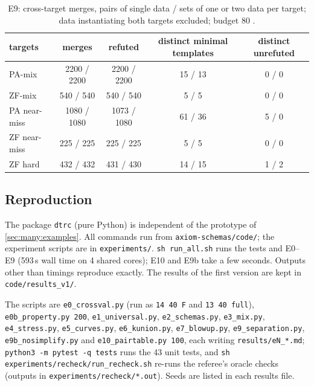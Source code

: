 \begin{table}[ht]
\centering\small
\begin{tabular}{@{}lcccc@{}}
\toprule
targets & merges & refuted & distinct minimal templates & distinct unrefuted\\
\midrule
PA-mix & 2200 / 2200 & 2200 / 2200 & 15 / 13 & 0 / 0\\
ZF-mix & 540 / 540 & 540 / 540 & 5 / 5 & 0 / 0\\
PA near-miss & 1080 / 1080 & 1073 / 1080 & 61 / 36 & 5 / 0\\
ZF near-miss & 225 / 225 & 225 / 225 & 5 / 5 & 0 / 0\\
ZF hard & 432 / 432 & 431 / 430 & 14 / 15 & 1 / 2\\
\bottomrule
\end{tabular}
\caption{E9: cross-target merges, pairs of single data / sets of one or two data per target; data instantiating both targets excluded; budget $80$ .}
\label{tab:exp:e9}
\end{table}

\subsection{Reproduction}\label{app:exp:repro}

The package \texttt{dtrc} (pure Python) is independent of the prototype of \cref{sec:many:examples}. All commands run from \texttt{axiom-schemas/code/}; the experiment scripts are in \texttt{experiments/}. \texttt{sh run\_all.sh} runs the tests and E0--E9 (593\,s wall time on 4 shared cores); E10 and E9b take a few seconds. Outputs other than timings reproduce exactly. The results of the first version are kept in \texttt{code/results\_v1/}.

\begin{sloppypar}
The scripts are \texttt{e0\_crossval.py} (run as \texttt{14 40 F} and \texttt{13 40 full}), \texttt{e0b\_property.py 200}, \texttt{e1\_universal.py}, \texttt{e2\_schemas.py}, \texttt{e3\_mix.py}, \texttt{e4\_stress.py}, \texttt{e5\_curves.py}, \texttt{e6\_kunion.py}, \texttt{e7\_blowup.py}, \texttt{e9\_separation.py}, \texttt{e9b\_nosimplify.py} and \texttt{e10\_pairtable.py 100}, each writing \texttt{results/eN\_*.md}; \texttt{python3 -m pytest -q tests} runs the 43 unit tests, and \texttt{sh experiments/recheck/run\_recheck.sh} re-runs the referee's oracle checks (outputs in \texttt{experiments/recheck/*.out}). Seeds are listed in each results file.
\end{sloppypar}
